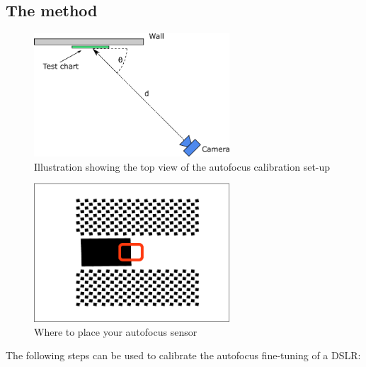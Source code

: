 \documentclass[a4paper]{article}
\begin{document}
\subsection{The method}
%
\begin{figure}[bp!]
\centering
\includegraphics[width=0.65\textwidth]{figures/af_setup}
\caption{Illustration showing the top view of the autofocus calibration
set-up}
\label{fig:af_setup}
\end{figure}
%
\begin{figure}[bp!]
\centering
\includegraphics[width=0.65\textwidth]{figures/af_sensor_placement}
\caption{Where to place your autofocus sensor}
\label{fig:af_sensor_placement}
\end{figure}
%
The following steps can be used to calibrate the autofocus fine-tuning of a
DSLR:
\end{document}
